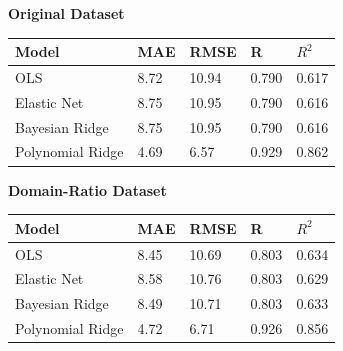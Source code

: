 \documentclass{article}
\begin{document}
\begin{table}[H]
\centering

\begin{minipage}[t]{0.48\textwidth}
\centering
\textbf{Original Dataset}\\[0.4em]
\begin{tabular}{@{}lllll@{}}
\toprule
\textbf{Model} & \textbf{MAE} & \textbf{RMSE} & \textbf{R} & \textbf{$R^2$} \\
\midrule
OLS              & 8.72 & 10.94 & 0.790 & 0.617 \\
Elastic Net      & 8.75 & 10.95 & 0.790 & 0.616 \\
Bayesian Ridge   & 8.75 & 10.95 & 0.790 & 0.616 \\
Polynomial Ridge & 4.69 &  6.57 & 0.929 & 0.862 \\
\bottomrule
\end{tabular}
\end{minipage}
\hfill
\begin{minipage}[t]{0.48\textwidth}
\centering
\textbf{Domain-Ratio Dataset}\\[0.4em]
\begin{tabular}{@{}lllll@{}}
\toprule
\textbf{Model} & \textbf{MAE} & \textbf{RMSE} & \textbf{R} & \textbf{$R^2$} \\
\midrule
OLS              & 8.45 & 10.69 & 0.803 & 0.634 \\
Elastic Net      & 8.58 & 10.76 & 0.803 & 0.629 \\
Bayesian Ridge   & 8.49 & 10.71 & 0.803 & 0.633 \\
Polynomial Ridge & 4.72 &  6.71 & 0.926 & 0.856 \\
\bottomrule
\end{tabular}
\end{minipage}

\vspace{1em}


\end{table}
\end{document}
